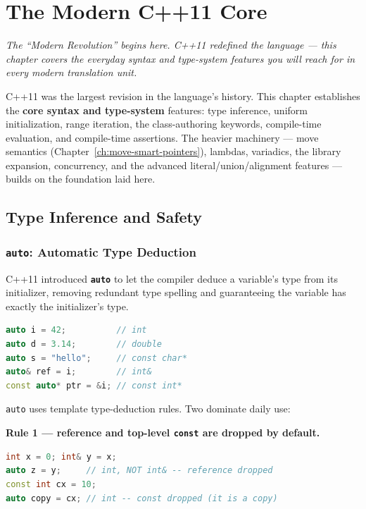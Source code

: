 \chapter{The Modern C++11 Core}
\label{ch:modern-cpp11-core}

\textit{The ``Modern Revolution'' begins here. C++11 redefined the language --- this chapter covers the everyday syntax and type-system features you will reach for in every modern translation unit.}

C++11 was the largest revision in the language's history. This chapter establishes the \textbf{core syntax and type-system} features: type inference, uniform initialization, range iteration, the class-authoring keywords, compile-time evaluation, and compile-time assertions. The heavier machinery --- move semantics (Chapter~\ref{ch:move-smart-pointers}), lambdas, variadics, the library expansion, concurrency, and the advanced literal/union/alignment features --- builds on the foundation laid here.

\section{Type Inference and Safety}

\subsection{\texttt{auto}: Automatic Type Deduction}

C++11 introduced \textbf{\texttt{auto}} to let the compiler deduce a variable's type from its initializer, removing redundant type spelling and guaranteeing the variable has exactly the initializer's type.

\begin{lstlisting}[language=C++, caption={auto deduction basics}]
auto i = 42;          // int
auto d = 3.14;        // double
auto s = "hello";     // const char*
auto& ref = i;        // int&
const auto* ptr = &i; // const int*
\end{lstlisting}

\texttt{auto} uses template type-deduction rules. Two dominate daily use:

\textbf{Rule 1 --- reference and top-level \texttt{const} are dropped by default.}

\begin{lstlisting}[language=C++, caption={auto drops references and top-level const}]
int x = 0; int& y = x;
auto z = y;     // int, NOT int& -- reference dropped
const int cx = 10;
auto copy = cx; // int -- const dropped (it is a copy)
\end{lstlisting}

